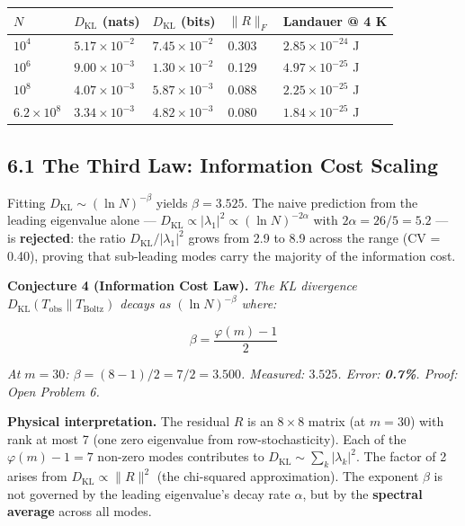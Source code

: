 \documentclass[
  11pt,
]{article}
\numberwithin{equation}{section}
\begin{document}
\begin{center}
\begin{tabular}{@{}lllll@{}}
\toprule
\(N\) & \(D_{\text{KL}}\) (nats) & \(D_{\text{KL}}\) (bits) & \(\lVert R\rVert_F\) & Landauer @ 4 K \\
\midrule
\(10^4\) & \(5.17 \times 10^{-2}\) & \(7.45 \times 10^{-2}\) & 0.303 & \(2.85 \times 10^{-24}\) J \\
\(10^6\) & \(9.00 \times 10^{-3}\) & \(1.30 \times 10^{-2}\) & 0.129 & \(4.97 \times 10^{-25}\) J \\
\(10^8\) & \(4.07 \times 10^{-3}\) & \(5.87 \times 10^{-3}\) & 0.088 & \(2.25 \times 10^{-25}\) J \\
\(6.2 \times 10^8\) & \(3.34 \times 10^{-3}\) & \(4.82 \times 10^{-3}\) & 0.080 & \(1.84 \times 10^{-25}\) J \\
\bottomrule
\end{tabular}
\end{center}

\subsection{6.1 The Third Law: Information Cost
Scaling}\label{the-third-law-information-cost-scaling}

Fitting \(D_{\text{KL}} \sim (\ln N)^{-\beta}\) yields
\(\beta = 3.525\). The naive prediction from the leading eigenvalue
alone ---
\(D_{\text{KL}} \propto |\lambda_1|^2 \propto (\ln N)^{-2\alpha}\) with
\(2\alpha = 26/5 = 5.2\) --- is \textbf{rejected}: the ratio
\(D_{\text{KL}}/|\lambda_1|^2\) grows from 2.9 to 8.9 across the range
(CV = 0.40), proving that sub-leading modes carry the majority of the
information cost.

\textbf{Conjecture 4 (Information Cost Law).} \emph{The KL divergence
\(D_{\text{KL}}(T_{\text{obs}} \| T_{\text{Boltz}})\) decays as
\((\ln N)^{-\beta}\) where:}

\begin{equation}\boxed{\beta = \frac{\varphi(m) - 1}{2}}\end{equation}

\emph{At \(m = 30\): \(\beta = (8-1)/2 = 7/2 = 3.500\). Measured:
\(3.525\). Error: \textbf{0.7\%}. Proof: Open Problem 6.}

\textbf{Physical interpretation.} The residual \(R\) is an
\(8 \times 8\) matrix (at \(m = 30\)) with rank at most 7 (one zero
eigenvalue from row-stochasticity). Each of the \(\varphi(m) - 1 = 7\)
non-zero modes contributes to
\(D_{\text{KL}} \sim \sum_k |\lambda_k|^2\). The factor of 2 arises from
\(D_{\text{KL}} \propto \|R\|^2\) (the chi-squared approximation). The
exponent \(\beta\) is not governed by the leading eigenvalue's decay
rate \(\alpha\), but by the \textbf{spectral average} across all modes.
\end{document}
